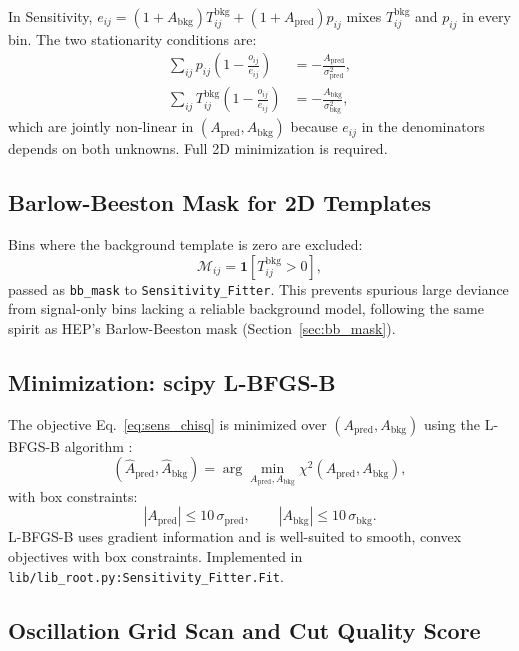 \documentclass[12pt,a4paper]{article}
\newcommand{\Tbkg}{T^{\mathrm{bkg}}_{ij}}
\newcommand{\Apred}{A_{\mathrm{pred}}}
\newcommand{\Abkg}{A_{\mathrm{bkg}}}
\newcommand{\spred}{\sigma_{\mathrm{pred}}}
\newcommand{\sbkg}{\sigma_{\mathrm{bkg}}}
\newcommand{\eij}{e_{ij}}
\newcommand{\oij}{o_{ij}}
\begin{document}
In Sensitivity, $\eij=(1+\Abkg)\Tbkg+(1+\Apred)p_{ij}$ mixes $\Tbkg$
and $p_{ij}$ in every bin.  The two stationarity conditions are:
\begin{align}
  \sum_{ij} p_{ij}\!\left(1-\frac{\oij}{\eij}\right)
    &= -\frac{\Apred}{\spred^2},
  \label{eq:sens_stat_pred}\\
  \sum_{ij} \Tbkg\!\left(1-\frac{\oij}{\eij}\right)
    &= -\frac{\Abkg}{\sbkg^2},
  \label{eq:sens_stat_bkg}
\end{align}
which are jointly non-linear in $(\Apred,\Abkg)$ because $\eij$ in
the denominators depends on both unknowns.  Full 2D minimization is
required.

\subsection{Barlow-Beeston Mask for 2D Templates}
\label{sec:sens_bb}

Bins where the background template is zero are excluded:
\begin{equation}
  \mathcal{M}_{ij} = \mathbf{1}\!\left[\Tbkg > 0\right],
  \label{eq:sens_bb_mask}
\end{equation}
passed as \texttt{bb\_mask} to \texttt{Sensitivity\_Fitter}.
This prevents spurious large deviance from signal-only bins
lacking a reliable background model,
following the same spirit as HEP's Barlow-Beeston mask
(Section~\ref{sec:bb_mask}).

\subsection{Minimization: scipy L-BFGS-B}
\label{sec:sens_minimization}

The objective Eq.~\eqref{eq:sens_chisq} is minimized over
$(\Apred,\Abkg)$ using the L-BFGS-B algorithm
\cite{ByrdEtAl1995,ZhuEtAl1997}:
\begin{equation}
  (\hat{A}_{\mathrm{pred}},\hat{A}_{\mathrm{bkg}})
  = \arg\min_{\Apred,\Abkg}\chi^2(\Apred,\Abkg),
  \label{eq:sens_minimize}
\end{equation}
with box constraints:
\begin{equation}
  |\Apred| \le 10\,\spred,
  \qquad
  |\Abkg| \le 10\,\sbkg.
  \label{eq:sens_bounds}
\end{equation}
L-BFGS-B uses gradient information and is well-suited to smooth,
convex objectives with box constraints.
Implemented in \texttt{lib/lib\_root.py:Sensitivity\_Fitter.Fit}.

\subsection{Oscillation Grid Scan and Cut Quality Score}
\label{sec:sens_scan}
\end{document}
